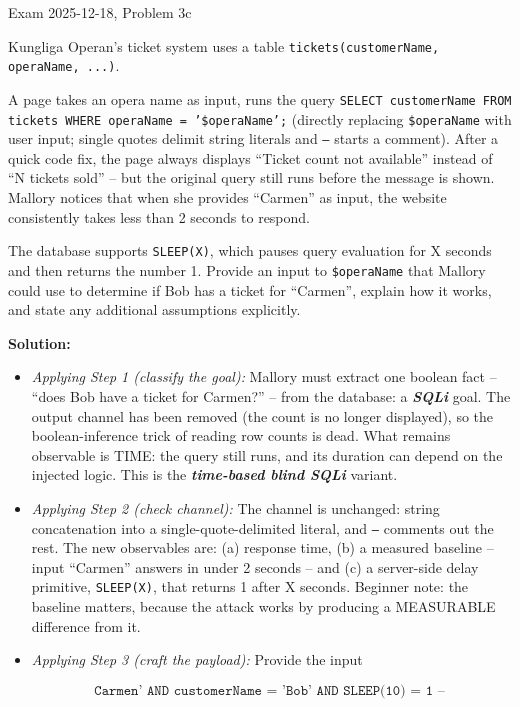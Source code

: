\documentclass[12pt, a4paper]{article}
\newcommand{\term}[1]{\textbf{\textit{#1}}}        %
\begin{document}
\begin{practicebox}{Exam 2025-12-18, Problem 3c}
\begin{problembox}
Kungliga Operan's ticket system uses a table \texttt{tickets(customerName, operaName, ...)}.

A page takes an opera name as input, runs the query \texttt{SELECT customerName FROM tickets WHERE operaName = '\$operaName';} (directly replacing \texttt{\$operaName} with user input; single quotes delimit string literals and \texttt{--} starts a comment).
After a quick code fix, the page always displays ``Ticket count not available'' instead of ``N tickets sold'' -- but the original query still runs before the message is shown.
Mallory notices that when she provides ``Carmen'' as input, the website consistently takes less than 2 seconds to respond.

The database supports \texttt{SLEEP(X)}, which pauses query evaluation for X seconds and then returns the number 1. Provide an input to \texttt{\$operaName} that Mallory could use to determine if Bob has a ticket for ``Carmen'', explain how it works, and state any additional assumptions explicitly.
\end{problembox}

\textbf{Solution:}
\begin{itemize}
    \item \textit{Applying Step 1 (classify the goal):} Mallory must extract one boolean fact -- ``does Bob have a ticket for Carmen?'' -- from the database: a \term{SQLi} goal. The output channel has been removed (the count is no longer displayed), so the boolean-inference trick of reading row counts is dead.
    What remains observable is TIME: the query still runs, and its duration can depend on the injected logic. This is the \term{time-based blind SQLi} variant.
    \item \textit{Applying Step 2 (check channel):} The channel is unchanged: string concatenation into a single-quote-delimited literal, and \texttt{--} comments out the rest.
    The new observables are: (a) response time, (b) a measured baseline -- input ``Carmen'' answers in under 2 seconds -- and (c) a server-side delay primitive, \texttt{SLEEP(X)}, that returns 1 after X seconds. Beginner note: the baseline matters, because the attack works by producing a MEASURABLE difference from it.
    \item \textit{Applying Step 3 (craft the payload):} Provide the input

\[
\texttt{Carmen' AND customerName = 'Bob' AND SLEEP(10) = 1 -- }
\]


\end{itemize}
\end{practicebox}
\end{document}
